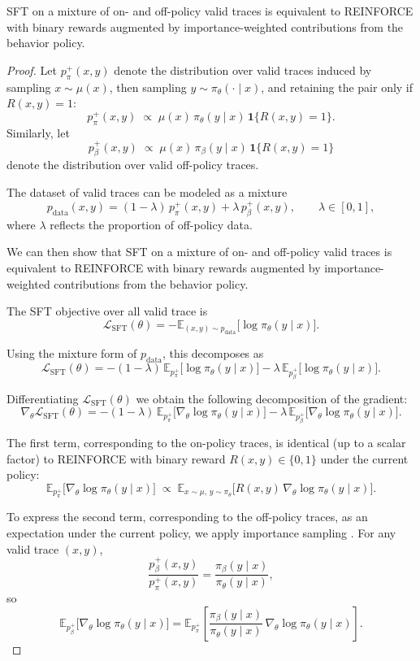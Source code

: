 \begin{proposition}
SFT on a mixture of on- and off-policy valid traces is equivalent to REINFORCE
with binary rewards augmented by importance-weighted contributions from the
behavior policy.
\end{proposition}
\begin{proof}
Let $p_\pi^+(x,y)$ denote the distribution over valid traces induced by
sampling $x \sim \mu(x)$, then sampling $y \sim \pi_\theta(\cdot \mid x)$, and
retaining the pair only if $R(x,y)=1$:
\[
p_\pi^+(x,y)
\;\propto\;
\mu(x)\,\pi_\theta(y\mid x)\,\mathbf{1}\{R(x,y)=1\}.
\]
Similarly, let
\[
p_\beta^+(x,y)
\;\propto\;
\mu(x)\,\pi_\beta(y\mid x)\,\mathbf{1}\{R(x,y)=1\}
\]
denote the distribution over valid off-policy traces.

The dataset of valid traces can be modeled as a mixture
\[
p_{\mathrm{data}}(x,y)
=
(1-\lambda)\,p_\pi^+(x,y)
+ \lambda\,p_\beta^+(x,y),
\qquad \lambda \in [0,1],
\]
where $\lambda$ reflects the proportion of off-policy data.

We can then show that SFT on a mixture of on- and off-policy valid traces
is equivalent to REINFORCE with binary rewards augmented by importance-weighted
contributions from the behavior policy.

The SFT objective over all valid trace is
\[
\mathcal{L}_{\mathrm{SFT}}(\theta)
=
-\mathbb{E}_{(x,y)\sim p_{\mathrm{data}}}
\big[\log \pi_\theta(y\mid x)\big].
\]

Using the mixture form of $p_{\mathrm{data}}$, this decomposes as
\[
\mathcal{L}_{\mathrm{SFT}}(\theta)
=
-(1-\lambda)\,\mathbb{E}_{p_\pi^+}
\big[\log \pi_\theta(y\mid x)\big]
-
\lambda\,\mathbb{E}_{p_\beta^+}
\big[\log \pi_\theta(y\mid x)\big].
\]

Differentiating $\mathcal{L}_{\mathrm{SFT}}(\theta)$ we obtain the following decomposition of the gradient:
\[
\nabla_\theta \mathcal{L}_{\mathrm{SFT}}(\theta)
=
-(1-\lambda)\,\mathbb{E}_{p_\pi^+}
\big[\nabla_\theta \log \pi_\theta(y\mid x)\big]
-
\lambda\,\mathbb{E}_{p_\beta^+}
\big[\nabla_\theta \log \pi_\theta(y\mid x)\big].
\]

The first term, corresponding to the on-policy traces, is identical (up to a
scalar factor) to REINFORCE with binary reward $R(x,y)\in\{0,1\}$ under the
current policy:
\[
\mathbb{E}_{p_\pi^+}
\big[\nabla_\theta \log \pi_\theta(y\mid x)\big]
\;\propto\;
\mathbb{E}_{x\sim \mu,\, y\sim \pi_\theta}
\big[R(x,y)\,\nabla_\theta \log \pi_\theta(y\mid x)\big].
\]

To express the second term, corresponding to the off-policy traces, as an
expectation under the current policy, we apply importance sampling
\cite{precup-et-al-icml2000}. For any valid trace $(x,y)$,
\[
\frac{p_\beta^+(x,y)}{p_\pi^+(x,y)}
=
\frac{\pi_\beta(y\mid x)}{\pi_\theta(y\mid x)},
\]
so
\[
\mathbb{E}_{p_\beta^+}
\big[\nabla_\theta \log \pi_\theta(y\mid x)\big]
=
\mathbb{E}_{p_\pi^+}
\left[
\frac{\pi_\beta(y\mid x)}{\pi_\theta(y\mid x)}\,
\nabla_\theta \log \pi_\theta(y\mid x)
\right].
\]


\end{proof}
